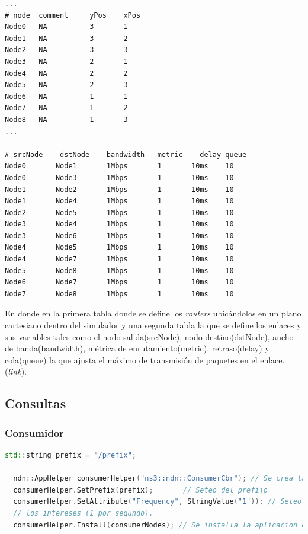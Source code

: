 \documentclass[12pt]{ociamthesis}  %
\begin{document}
\begin{lstlisting}[frame=single]
...
# node  comment     yPos    xPos
Node0   NA          3       1
Node1   NA          3       2
Node2   NA          3       3
Node3   NA          2       1
Node4   NA          2       2
Node5   NA          2       3
Node6   NA          1       1
Node7   NA          1       2
Node8   NA          1       3
...

# srcNode    dstNode    bandwidth   metric    delay queue
Node0       Node1       1Mbps       1       10ms    10
Node0       Node3       1Mbps       1       10ms    10
Node1       Node2       1Mbps       1       10ms    10
Node1       Node4       1Mbps       1       10ms    10
Node2       Node5       1Mbps       1       10ms    10
Node3       Node4       1Mbps       1       10ms    10
Node3       Node6       1Mbps       1       10ms    10
Node4       Node5       1Mbps       1       10ms    10
Node4       Node7       1Mbps       1       10ms    10
Node5       Node8       1Mbps       1       10ms    10
Node6       Node7       1Mbps       1       10ms    10
Node7       Node8       1Mbps       1       10ms    10
\end{lstlisting}

En donde en la primera tabla donde se define los \textit{routers} ubicándolos en un plano cartesiano dentro del simulador y una segunda tabla la que se define los enlaces y sus variables tales como el nodo salida(srcNode), nodo destino(dstNode), ancho de banda(bandwidth), métrica de enrutamiento(metric), retraso(delay) y cola(queue) la que ajusta el máximo de transmisión de paquetes en el enlace.  (\textit{link}).

\pagebreak

\subsection{Consultas}
\subsubsection{Consumidor}

\begin{lstlisting}[language=cpp,caption={Caption}]
  std::string prefix = "/prefix";
  
  ndn::AppHelper consumerHelper("ns3::ndn::ConsumerCbr"); // Se crea la instancia
  consumerHelper.SetPrefix(prefix);       // Seteo del prefijo
  consumerHelper.SetAttribute("Frequency", StringValue("1")); // Seteo de la frecuencia en que enviara 
  // los intereses (1 por segundo).
  consumerHelper.Install(consumerNodes); // Se installa la aplicacion en uno o mas nodos.
\end{lstlisting}
\end{document}
